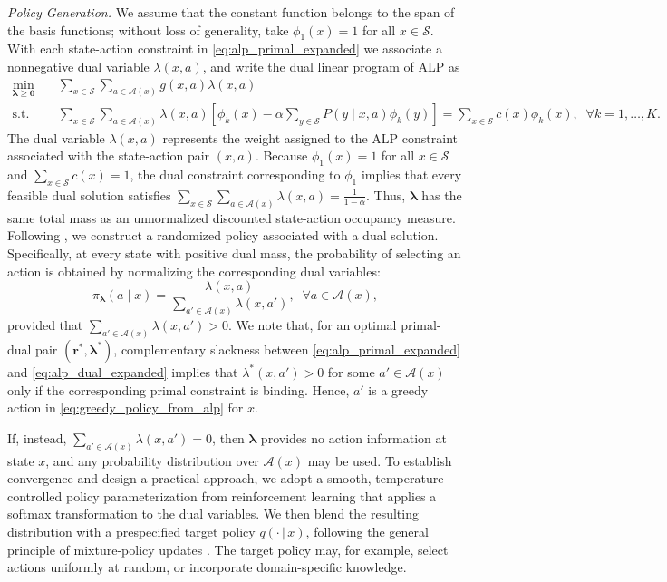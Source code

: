 \documentclass[sglanonrev]{informs4}
\providecommand{\blambda}{\boldsymbol{\lambda}}
\providecommand{\br}{\boldsymbol{r}}
\providecommand{\bzero}{\boldsymbol{0}}
\begin{document}
\smallskip
\noindent 
\textit{Policy Generation.} We assume that the constant function belongs to the span of the basis functions; without loss of generality, take $\phi_1(x)=1$ for all
$x\in\mathcal S$. With each state-action constraint in \eqref{eq:alp_primal_expanded} we associate a nonnegative dual variable $\lambda(x,a)$, and write the dual linear program of \ac{ALP} as
\begin{equation}
\label{eq:alp_dual_expanded}
\tag{dALP}
\begin{aligned}
  \min_{\blambda\geq\bzero}\quad
  &
  \sum_{x\in\mathcal S}
  \sum_{a\in\mathcal A(x)}
  g(x,a)\lambda(x,a) \\
  \text{s.t.}\quad
  &
  \sum_{x\in\mathcal S}
  \sum_{a\in\mathcal A(x)}
  \lambda(x,a)
  \left[
  \phi_k(x)
  -
  \alpha\sum_{y\in\mathcal S}P(y\mid x,a)\phi_k(y)
  \right]
  =
  \sum_{x\in\mathcal S}c(x)\phi_k(x),
  \;\; \forall k=1,\ldots,K.
\end{aligned}
\end{equation}
The dual variable $\lambda(x,a)$ represents the weight assigned to the
\ac{ALP} constraint associated with the state-action pair $(x,a)$.
Because $\phi_1(x)=1$ for all $x\in\mathcal S$ and
$\sum_{x\in\mathcal S}c(x)=1$, the dual constraint corresponding to
$\phi_1$ implies that every feasible dual solution satisfies
$\sum_{x\in\mathcal S}
\sum_{a\in\mathcal A(x)}
\lambda(x,a)
=
\frac{1}{1-\alpha}.$ Thus, $\blambda$ has the same total mass as an unnormalized discounted state-action occupancy measure. Following \citet[Definition~6.1.3]{guestrin2003planning}, we construct a randomized policy associated with a dual solution. Specifically, at every state with positive dual mass, the probability of selecting an action is obtained by normalizing the corresponding dual variables:
\begin{equation}
\label{eq:dual_fluid_policy}
\pi_{\blambda}(a\mid x)
=
\frac{\lambda(x,a)}
{\sum_{a'\in\mathcal A(x)}\lambda(x,a')},
\;\; \forall a\in\mathcal A(x),
\end{equation}
provided that $\sum_{a'\in\mathcal A(x)}\lambda(x,a')>0$.  We note that, for an optimal primal-dual pair $(\br^*,\blambda^*)$,
complementary slackness between
\eqref{eq:alp_primal_expanded} and
\eqref{eq:alp_dual_expanded} implies that
$\lambda^*(x,a')>0$ for some $a' \in \mathcal A(x)$ only if the corresponding primal constraint is
binding. Hence, $a'$ is a greedy action in
\eqref{eq:greedy_policy_from_alp} for $x$.

If, instead, $\sum_{a'\in\mathcal A(x)}\lambda(x,a')=0$, then $\blambda$ provides no action information at state $x$, and any probability distribution over $\mathcal A(x)$ may be used. To establish convergence and design a practical approach, we adopt a smooth, temperature-controlled policy parameterization from reinforcement learning \citep{papini2022smoothing} that applies a softmax transformation to the dual variables. We then blend the resulting distribution with a prespecified target policy $q(\cdot \,|\, x)$, following the general principle of mixture-policy updates \citep{kakade2002approximately}. The target policy may, for example, select actions uniformly at random, or incorporate domain-specific knowledge.
\end{document}
